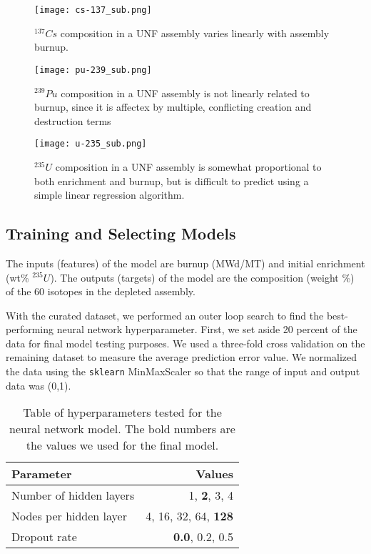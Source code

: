\begin{figure}
    \centering
    \texttt{[image: cs-137\_sub.png]}
    \caption{$^{137}Cs$ composition in a \gls{UNF} assembly
             varies linearly with assembly burnup.}
    \label{fig:cs_137}
\end{figure}

\begin{figure}
    \centering
    \texttt{[image: pu-239\_sub.png]}
    \caption{$^{239}Pu$ composition in a \gls{UNF} assembly
             is not linearly related to burnup, since it
             is affectex by multiple, conflicting creation
             and destruction terms}
    \label{fig:pu_239}
\end{figure}


\begin{figure}
    \centering
    \texttt{[image: u-235\_sub.png]}
    \caption{$^{235}U$ composition in a \gls{UNF} assembly
             is somewhat proportional to both enrichment and
             burnup, but is difficult to predict using
             a simple linear regression algorithm.}
    \label{fig:u_235}
\end{figure}


\subsection{Training and Selecting Models}

The inputs (features) of the model are
burnup (MWd/MT) and initial enrichment (wt\% $^{235}U$).
The outputs (targets) of the model are
the composition (weight \%) of the 60 isotopes in the
depleted assembly.

With the curated dataset, we performed an outer loop
search to find the best-performing neural network
hyperparameter. First, we set aside 20 percent of the 
data for final model testing purposes. We used a three-fold
cross validation \cite{stone1974cross} on the remaining
dataset to
measure the average prediction error value. We
normalized the data using the \texttt{sklearn} MinMaxScaler
so that the range of input and output data was (0,1).

\begin{table}[h]
    \centering
    \begin{tabular}{lr}
        \hline
        Parameter & Values \\
        \hline
        Number of hidden layers & 1, \textbf{2}, 3, 4 \\
        Nodes per hidden layer & 4, 16, 32, 64, \textbf{128} \\
        Dropout rate & \textbf{0.0}, 0.2, 0.5 \\
        \hline
    \end{tabular}
    \caption{Table of hyperparameters tested
             for the neural network model. The bold
             numbers are the values we used for the final model.}
\end{table}


